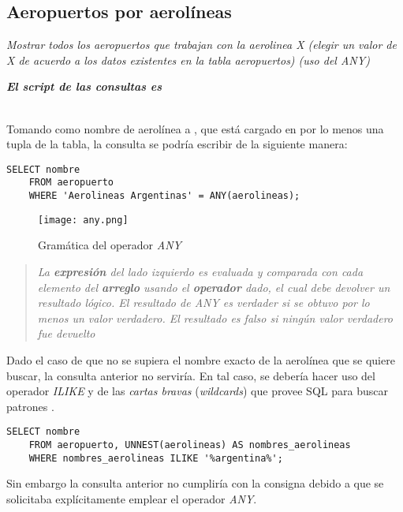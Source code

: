 \subsection{Aeropuertos por aerolíneas}
\emph{Mostrar todos los aeropuertos que trabajan con la aerolinea X (elegir un valor de X de acuerdo a los datos existentes en la tabla aeropuertos) (uso del ANY)} 

\emph{\textbf{El script de las consultas es }} 
\\~

Tomando como nombre de aerolínea a , que está cargado en por lo menos una tupla de la tabla, la consulta se podría escribir de la siguiente manera:

\vspace*{5mm}
\lstset{style=sql}
\begin{lstlisting}
SELECT nombre
    FROM aeropuerto 
    WHERE 'Aerolineas Argentinas' = ANY(aerolineas);
\end{lstlisting}

\begin{figure}[H]
    \texttt{[image: any.png]}
    \caption{Gramática del operador \emph{ANY} \autocite{any}}
\end{figure}

\begin{quote}\itshape
    La \textbf{expresión} del lado izquierdo es evaluada y comparada con cada elemento del \textbf{arreglo} usando el \textbf{operador} dado, el cual debe devolver un resultado lógico. El resultado de \emph{ANY} es verdader si se obtuvo por lo menos un valor verdadero. El resultado es falso si ningún valor verdadero fue devuelto \autocite{any}    
\end{quote}

Dado el caso de que no se supiera el nombre exacto de la aerolínea que se quiere buscar, la consulta anterior no serviría. En tal caso, se debería hacer uso del operador \emph{ILIKE} y de las \emph{cartas bravas} (\emph{wildcards}) que provee SQL para buscar patrones \autocite{pattern}.

\vspace*{5mm}
\lstset{style=sql}
\begin{lstlisting}
SELECT nombre
    FROM aeropuerto, UNNEST(aerolineas) AS nombres_aerolineas 
    WHERE nombres_aerolineas ILIKE '%argentina%';
\end{lstlisting}

Sin embargo la consulta anterior no cumpliría con la consigna debido a que se solicitaba explícitamente emplear el operador \emph{ANY}.

